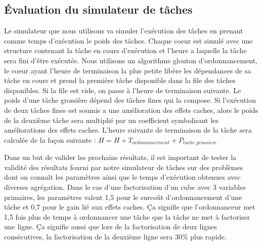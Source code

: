 \subsection{\'Evaluation du simulateur de tâches}
Le simulateur que nous utilisons va simuler l'exécution des tâches en prenant comme temps d'exécution le poids des tâches.
%
Chaque coeur est simulé avec une structure contenant la tâche en cours d'exécution et l'heure a laquelle la tâche sera fini d'être exécutée.
%
Nous utilisons un algorithme glouton d'ordonnancement, le coeur ayant l'heure de terminaison la plus petite libère les dépendances de sa tâche en cours et prend la première tâche disponible dans la file des tâches disponibles.
%
Si la file est vide, on passe à l'heure de terminaison suivante.
%
Le poids d'une tâche grossière dépend des tâches fines qui la compose.
%
Si l'exécution de deux tâches fines est soumis a une amélioration des effets caches, alors le poids de la deuxième tâche sera multiplié par un coefficient symbolisant les améliorations des effets caches.
%
L'heure suivante de terminaison de la tâche sera calculée de la façon suivante : $H = H + T_{ordonnancement} + P_{tache\_grossiere}$



Dans un but de valider les prochains résultats, il est important de tester la validité des résultats fourni par notre simulateur de tâches sur des problèmes dont on connaît les paramètres ainsi que le temps d'exécution obtenues avec diverses agrégation.
%
Dans le cas d'une factorisation d'un cube avec 3 variables primaires, les paramètres valent 1,5 pour le surcoût d'ordonnancement d'une tâche et 0,7 pour le gain lié aux effets caches.
%
Ça signifie que l'ordonnanceur met 1,5 fois plus de temps à ordonnancer une tâche que la tâche ne met à factoriser une ligne.
%
Ça signifie aussi que lors de la factorisation de deux lignes consécutives, la factorisation de la deuxième ligne sera 30\% plus rapide.
